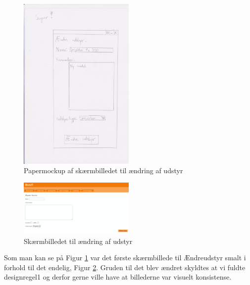 \begin{figure}[h!]
  \centering
    \includegraphics[width=0.5\textwidth]{Appendix/GUI-Prototype/PaperMockup/AendreUdstyr_001}
  \caption{Papermockup af skærmbilledet til ændring af udstyr}
\label{Design_G_Development_EquipmentChange}
\end{figure} 

\begin{figure}[h!]
  \centering
    \includegraphics[width=0.5\textwidth]{Appendix/GUI-Prototype/DigitalMockup/AendreUdstyr}
  \caption{Skærmbilledet til ændring af udstyr}
\label{Design_G_Development_EquipmentChange_Final}
\end{figure} 

Som man kan se på Figur \ref{Design_G_Development_EquipmentChange} var det første skærmbillede til Ændreudstyr smalt i forhold til det endelig, Figur \ref{Design_G_Development_EquipmentChange_Final}. Gruden til det blev ændret skyldtes at vi fuldte designregel1 og derfor gerne ville have at billederne var visuelt konsistense. 


